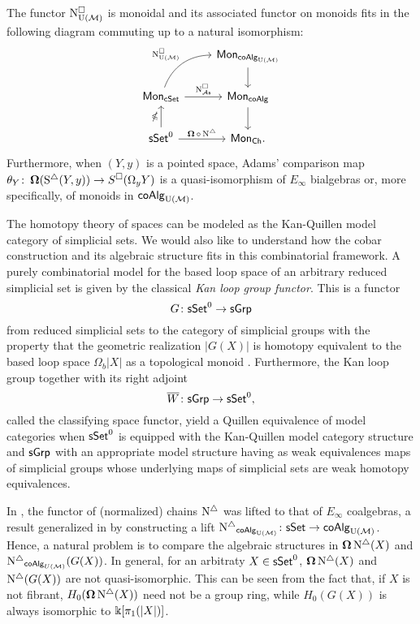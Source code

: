 \begin{theorem} \label{t:1st main thm in the intro}
	The functor $\operatorname{N^{\square}_{{\operatorname{U}(\mathcal{M})}}}$ is monoidal and its associated functor on monoids fits in the following diagram commuting up to a natural isomorphism:
	\begin{equation*}
	\begin{tikzcd}
	& \Mon_{\coAlg_\UM} \arrow[d] \\
	\Mon_{\cSet} \arrow[ru, "\cchainsUM", out=70, in=180] \arrow[r, "\cchainsAS"]
	& \Mon_{\coAlg} \arrow[d] \\
	\sSet^0 \arrow[r, "\cobar \circ \schains"] \arrow[u, "\ccobar"]
	& \Mon_{\Ch}.
	\end{tikzcd}
	\end{equation*}
	Furthermore, when $(Y, y)$ is a pointed space, Adams' comparison map $\theta_Y \colon \operatorname{\mathbf{\Omega}}(\operatorname{S^{\triangle}}(Y, y)) \to S^{\square}(\Omega_y Y)$ is a quasi-isomorphism of $E_\infty$ bialgebras or, more specifically, of monoids in $\mathsf{coAlg}_{\operatorname{U}(\mathcal{M})}$.
\end{theorem} 


The homotopy theory of spaces can be modeled as the Kan-Quillen model category of simplicial sets. We would also like to understand how the cobar construction and its algebraic structure fits in this combinatorial framework. A purely combinatorial model for the based loop space of an arbitrary reduced simplicial set is given by the classical \textit{Kan loop group functor}.
This is a functor 
$$G\colon \mathsf{sSet}^0 \to \mathsf{sGrp}$$
from reduced simplicial sets to the category of simplicial groups with the property that the geometric realization $|G(X)|$ is homotopy equivalent to the based loop space $\Omega_b|X|$ as a topological monoid \cite{berger1995loops}. Furthermore, the Kan loop group together with its right adjoint $$\overline{W} \colon  \mathsf{sGrp} \to \mathsf{sSet}^0,$$ called the classifying space functor, yield a Quillen equivalence of model categories when $\mathsf{sSet}^0$ is equipped with the Kan-Quillen model category structure and $\mathsf{sGrp}$ with an appropriate model structure having as weak equivalences maps of simplicial groups whose underlying maps of simplicial sets are weak homotopy equivalences. 

In \cite{mcclure2003multivariable, berger2004combinatorial}, the functor of (normalized) chains $\operatorname{N^{\triangle}}$ was lifted to that of $E_\infty$ coalgebras, a result generalized in \cite{medina2020prop1} by constructing a lift $\operatorname{N^{\triangle}}_{\mathsf{coAlg}_{{\operatorname{U}(\mathcal{M})}}} \colon \mathsf{sSet} \to \mathsf{coAlg}_{{\operatorname{U}(\mathcal{M})}}$. Hence, a natural problem is to compare the algebraic structures in $\operatorname{\mathbf{\Omega}} \operatorname{N^{\triangle}}(X)$ and $\operatorname{N^{\triangle}}_{\mathsf{coAlg}_{U(\mathcal{M})}}(G(X))$. In general, for an arbitraty $X \in \mathsf{sSet}^0$, $\operatorname{\mathbf{\Omega}} \operatorname{N^{\triangle}}(X)$ and $\operatorname{N^{\triangle}}(G(X))$ are not quasi-isomorphic.
This can be seen from the fact that, if $X$ is not fibrant, $H_0(\operatorname{\mathbf{\Omega}} \operatorname{N^{\triangle}}(X))$ need not be a group ring, while $H_0(G(X))$ is always isomorphic to $ \Bbbk[\pi_1(|X|)]$.

